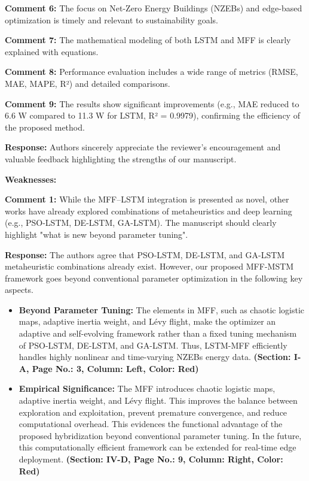 \documentclass[12pt]{article}
\begin{document}
\noindent\textbf{Comment 6:} The focus on Net-Zero Energy Buildings (NZEBs) and edge-based optimization is timely and relevant to sustainability goals.




\noindent\textbf{Comment 7:} The mathematical modeling of both LSTM and MFF is clearly explained with equations.



\noindent\textbf{Comment 8:} Performance evaluation includes a wide range of metrics (RMSE, MAE, MAPE, R²) and detailed comparisons.



\noindent\textbf{Comment 9:} The results show significant improvements (e.g., MAE reduced to 6.6 W compared to 11.3 W for LSTM, R² = 0.9979), confirming the efficiency of the proposed method.
\vspace{0.15cm}

\hspace{-1.5em}\textbf{Response:}
Authors sincerely appreciate the reviewer’s encouragement and valuable feedback highlighting the strengths of our manuscript.
\newline
\newline

\noindent\textbf{Weaknesses:} 

\noindent\textbf{Comment 1:} While the MFF–LSTM integration is presented as novel, other works have already explored combinations of metaheuristics and deep learning (e.g., PSO-LSTM, DE-LSTM, GA-LSTM). The manuscript should clearly highlight "what is new beyond parameter tuning".
\vspace{0.15cm}

\hspace{-1.5em}\textbf{Response:} The authors agree that PSO-LSTM, DE-LSTM, and GA-LSTM metaheuristic combinations already exist. However, our proposed MFF-MSTM framework goes beyond conventional parameter optimization in the following key aspects. 
\begin{itemize}
    

\item  \textbf{Beyond Parameter Tuning: }The elements in MFF, such as chaotic logistic maps, adaptive inertia weight, and Lévy flight, make the optimizer an adaptive and self-evolving framework rather than a fixed tuning mechanism of PSO-LSTM, DE-LSTM, and GA-LSTM. Thus, LSTM-MFF efficiently handles highly nonlinear and time-varying NZEBs energy data. \textbf{(Section: I-A, Page No.: 3, Column: Left, Color: Red)}

\item \textbf{Empirical Significance:} The MFF introduces chaotic logistic maps, adaptive inertia weight, and Lévy flight. This improves the balance between exploration and exploitation, prevent premature convergence, and reduce computational overhead. This evidences the functional advantage of the proposed hybridization beyond conventional parameter tuning. In the future, this computationally efficient framework can be extended for real-time edge deployment.  \textbf{(Section: IV-D, Page No.: 9, Column: Right, Color: Red)}
\end{itemize} 
\end{document}
